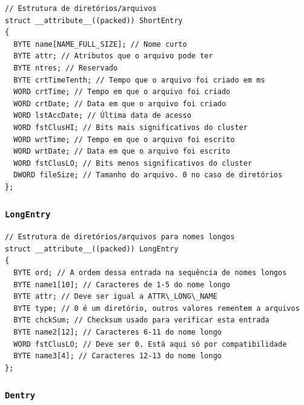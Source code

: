 \documentclass[
    12pt,				%
    oneside,   	        %
    a4paper,			%
    english,			%
    french,				%
    spanish,			%
    brazil,				%
    ]{pacotes/abntex2}
\begin{document}
\begin{lstlisting}[caption={Estrutura que representa uma entrada curta no sistema de arquivos}, label={lst:shortentry}] 
// Estrutura de diretórios/arquivos
struct __attribute__((packed)) ShortEntry
{
  BYTE name[NAME_FULL_SIZE]; // Nome curto 
  BYTE attr; // Atributos que o arquivo pode ter
  BYTE ntres; // Reservado
  BYTE crtTimeTenth; // Tempo que o arquivo foi criado em ms
  WORD crtTime; // Tempo em que o arquivo foi criado
  WORD crtDate; // Data em que o arquivo foi criado
  WORD lstAccDate; // Última data de acesso
  WORD fstClusHI; // Bits mais significativos do cluster
  WORD wrtTime; // Tempo em que o arquivo foi escrito
  WORD wrtDate; // Data em que o arquivo foi escrito
  WORD fstClusLO; // Bits menos significativos do cluster
  DWORD fileSize; // Tamanho do arquivo. 0 no caso de diretórios
};
\end{lstlisting}

\subsubsection{\texttt{LongEntry}}
\label{subsubsec:long_entry}

\begin{lstlisting}[caption={Estrutura que representa uma entrada longa no sistema de arquivos}, label={lst:longentry}] 
// Estrutura de diretórios/arquivos para nomes longos
struct __attribute__((packed)) LongEntry
{
  BYTE ord; // A ordem dessa entrada na sequência de nomes longos 
  BYTE name1[10]; // Caracteres de 1-5 do nome longo
  BYTE attr; // Deve ser igual a ATTR\_LONG\_NAME
  BYTE type; // 0 é um diretório, outros valores rementem a arquivos
  BYTE chckSum; // Checksum usado para verificar esta entrada
  BYTE name2[12]; // Caracteres 6-11 do nome longo
  WORD fstClusLO; // Deve ser 0. Está aqui só por compatibilidade
  BYTE name3[4]; // Caracteres 12-13 do nome longo
};
\end{lstlisting}

\subsubsection{\texttt{Dentry}}
\label{subsubsec:dentry}
\end{document}
